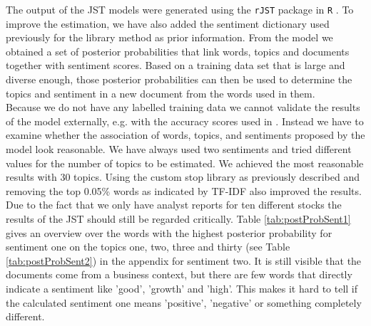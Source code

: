 The output of the JST models were generated using the \texttt{rJST} package in \texttt{R} \citep{rJST}. To improve the estimation, we have also added the sentiment dictionary used previously for the library method as prior information. From the model we obtained a set of posterior probabilities that link words, topics and documents together with sentiment scores. Based on a training data set that is large and diverse enough, those posterior probabilities can then be used to determine the topics and sentiment in a new document from the words used in them. 
\\
Because we do not have any labelled training data we cannot validate the results of the model externally, e.g. with the accuracy scores used in \citet{lin2009joint}. Instead we have to examine whether the association of words, topics, and sentiments proposed by the model look reasonable. We have always used two sentiments and tried different values for the number of topics to be estimated. We achieved the most reasonable results with 30 topics. Using the custom stop library as previously described and removing the top 0.05\% words as indicated by TF-IDF also improved the results. Due to the fact that we only have analyst reports for ten different stocks the results of the JST should still be regarded critically. 
Table \ref{tab:postProbSent1} gives an overview over the words  with the highest posterior probability for sentiment one on the topics one, two, three and thirty (see Table \ref{tab:postProbSent2}) in the appendix for sentiment two. It is still visible that the documents come from a business context, but there are few words that directly indicate a sentiment like 'good', 'growth' and 'high'. This makes it hard to tell if the calculated sentiment one means 'positive', 'negative' or something completely different. \\
